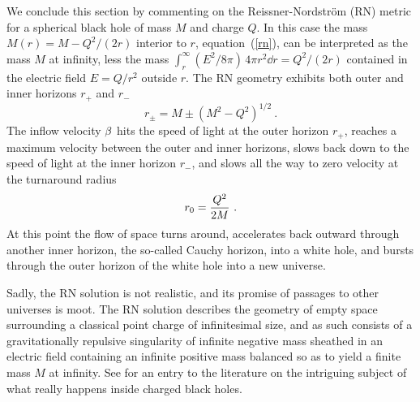 \documentclass[twocolumn,showpacs,preprintnumbers,amsmath,amssymb,prb]{revtex4}
\begin{document}
We conclude this section by commenting on
the Reissner-Nordstr\"om (RN) metric
for a spherical black hole of mass $M$ and charge $Q$.
In this case
the mass $M(r) = M - Q^2 / (2 r)$ interior to $r$, equation~(\ref{rn}),
can be interpreted as the mass $M$ at infinity, less the mass
$\int_r^\infty (E^2 / 8\pi) \, 4 \pi r^2 \dd r = Q^2/(2 r)$
contained in the electric field
$E = Q / r^2$
outside $r$.
The RN geometry
exhibits both outer and inner horizons $r_+$ and $r_-$
\begin{equation}
  r_{\pm} = M \pm (M^2 - Q^2)^{1/2}
  \ .
\end{equation}
The inflow velocity $\beta$
hits the speed of light at the outer horizon $r_+$,
reaches a maximum velocity
between the outer and inner horizons,
slows back down to the speed of light at the inner horizon $r_-$,
and slows all the way to zero velocity at the turnaround radius
\begin{equation}
  r_0 = {Q^2 \over 2 M}
  \ .
\end{equation}
At this point the flow of space turns around,
accelerates back outward through another inner horizon,
the so-called Cauchy horizon,
into a white hole,
and bursts through the outer horizon of the white hole into a new universe.

Sadly, the RN solution is not realistic,
and its promise of passages to other universes is moot.
The RN solution describes the geometry of empty space
surrounding a classical point charge of infinitesimal size,
and as such consists of
a gravitationally repulsive singularity of infinite negative mass
sheathed in an electric field containing an infinite positive mass
balanced so as to yield a finite mass $M$ at infinity.
See
\cite{HS04}
for an entry to the literature on the intriguing subject of what
really happens inside charged black holes.
\end{document}
